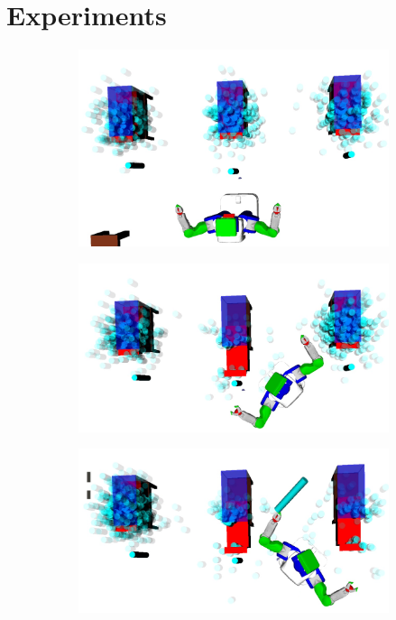 \section{Experiments}
\begin{figure}
  \centering
  \begin{subfigure}[b]{0.48\linewidth}
    \includegraphics[width=\textwidth]{drawer_images/drawer_dist_0.png}
    \caption{}
    \label{fig:step1}
  \end{subfigure}
  \begin{subfigure}[b]{0.48\linewidth}
    \includegraphics[width=\textwidth]{drawer_images/drawer_dist_1.png}
    \caption{}
    \label{fig:step2}
  \end{subfigure}
  \begin{subfigure}[b]{0.48\linewidth}
    \includegraphics[width=\textwidth]{drawer_images/drawer_dist_2.png}

\end{subfigure}
\end{figure}
